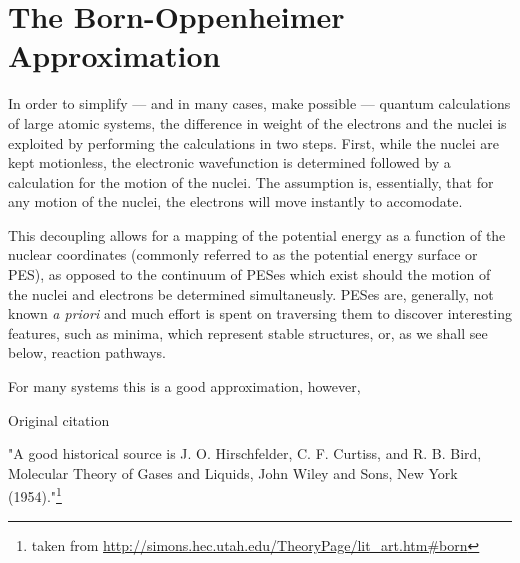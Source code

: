 \section{The Born-Oppenheimer Approximation}
\label{sec:born-oppenheimer}

In order to simplify --- and in many cases, make possible --- quantum calculations of large atomic systems, the difference in weight of the electrons and the nuclei is exploited by performing the calculations in two steps.
First, while the nuclei are kept motionless, the electronic wavefunction is determined followed by a calculation for the motion of the nuclei.
The assumption is, essentially, that for any motion of the nuclei, the electrons will move instantly to accomodate.


This decoupling allows for a mapping of the potential energy as a function of the nuclear coordinates (commonly referred to as the potential energy surface or PES), as opposed to the continuum of PESes which exist should the motion of the nuclei and electrons be determined simultaneusly.
PESes are, generally, not known \textit{a priori} and much effort is spent on traversing them to discover interesting features, such as minima, which represent stable structures, or, as we shall see below, reaction pathways.

For many systems this is a good approximation, however, \expand

\bit
\item Original citation~\cite{born-oppenheimer-1927}
\item "A good historical source is J. O. Hirschfelder, C. F. Curtiss, and R. B. Bird, Molecular Theory of Gases and Liquids, John Wiley and Sons, New York (1954)."\footnote{taken from \url{http://simons.hec.utah.edu/TheoryPage/lit_art.htm\#born}}
\eit
